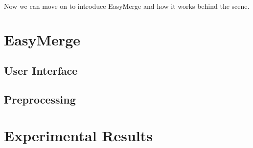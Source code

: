\documentclass{acm_proc_article-sp}
\begin{document}
Now we can move on to introduce EasyMerge and how it works behind the scene.


\section{EasyMerge}
\subsection{User Interface}

\subsection{Preprocessing}

\section{Experimental Results}


%

%
%
\end{document}
